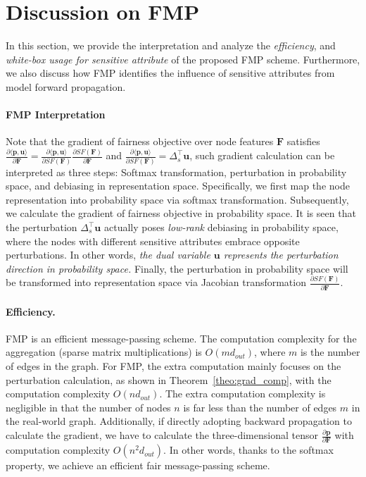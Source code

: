 \documentclass[letterpaper]{article} %
\theoremstyle{plain}
\theoremstyle{definition}
\theoremstyle{remark}
\begin{document}
\section{Discussion on FMP}
In this section, we provide the interpretation and analyze the \emph{efficiency}, and \emph{white-box usage for sensitive attribute} of the proposed FMP scheme. Furthermore, we also discuss how FMP identifies the influence of sensitive attributes from model forward propagation. 

\paragraph{FMP Interpretation} Note that the gradient of fairness objective over node features $\mathbf{F}$ satisfies $\frac{\partial \langle \mathbf{p}, \mathbf{u}\rangle}{\partial \mathbf{F}}=\frac{\partial \langle \mathbf{p}, \mathbf{u}\rangle}{\partial SF(\mathbf{F})}\frac{\partial SF(\mathbf{F})}{\partial \mathbf{F}}$ and $\frac{\partial \langle \mathbf{p}, \mathbf{u}\rangle}{\partial SF(\mathbf{F})}=\Delta_s^{\top}\mathbf{u}$, such gradient calculation can be interpreted as three steps: Softmax transformation, perturbation in probability space, and debiasing in representation space. Specifically, we first map the node representation into probability space via softmax transformation. Subsequently, we calculate the gradient of fairness objective in probability space. It is seen that the perturbation $\Delta_s^{\top}\mathbf{u}$ actually poses \emph{low-rank} debiasing in probability space, where the nodes with different sensitive attributes embrace opposite perturbations. In other words, \emph{the dual variable $\mathbf{u}$ represents the perturbation direction in probability space.}
Finally, the perturbation in probability space will be transformed into representation space via Jacobian transformation $\frac{\partial SF(\mathbf{F})}{\partial \mathbf{F}}$.

\paragraph{Efficiency.} FMP is an efficient message-passing scheme. The computation complexity for the aggregation (sparse matrix multiplications) is $O(md_{out})$, where $m$ is the number of edges in the graph.
For FMP, the extra computation mainly focuses on the perturbation calculation, as shown in Theorem~\ref{theo:grad_comp}, with the computation complexity $O(nd_{out})$. The extra computation complexity is negligible in that the number of nodes $n$ is far less than the number of edges $m$ in the real-world graph. Additionally, if directly adopting backward propagation to calculate the gradient, we have to calculate the three-dimensional tensor $\frac{\partial \mathbf{p}}{\partial \mathbf{F}}$ with computation complexity $O(n^2d_{out})$. In other words, 
thanks to the softmax property, we achieve an efficient fair message-passing scheme.
\end{document}
